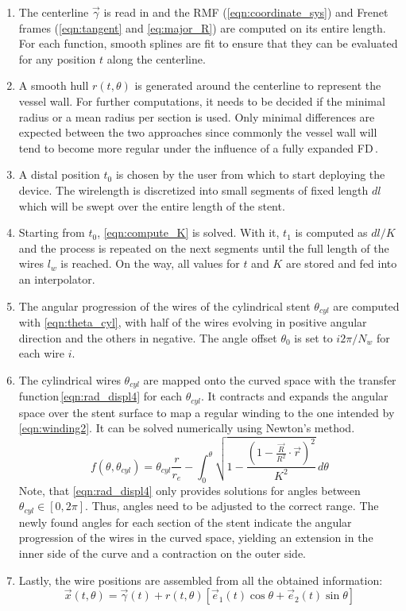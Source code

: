 \begin{enumerate}
	\item The centerline $\vec{\gamma}$ is read in and the RMF (\autoref{eqn:coordinate_sys}) and Frenet frames (\autoref{eqn:tangent} and \autoref{eq:major_R}) are computed on its entire length. For each function, smooth splines are fit to ensure that they can be evaluated for any position $t$ along the centerline.
	\item A smooth hull $r(t,\theta)$ is generated around the centerline to represent the vessel wall. For further computations, it needs to be decided if the minimal radius or a mean radius per section is used. Only minimal differences are expected between the two approaches since commonly the vessel wall will tend to become more regular under the influence of a fully expanded FD\,\cite{Bouillot2016}.
	\item A distal position $t_0$ is chosen by the user from which to start deploying the device. The wirelength is discretized into small segments of fixed length $dl$ which will be swept over the entire length of the stent.
	\item Starting from $t_0$, \autoref{eqn:compute_K} is solved. With it, $t_1$ is computed as $dl / K$ and the process is repeated on the next segments until the full length of the wires $l_w$ is reached. On the way, all values for $t$ and $K$ are stored and fed into an interpolator.
	\item The angular progression of the wires of the cylindrical stent $\theta_{cyl}$ are computed with \autoref{eqn:theta_cyl}, with half of the wires evolving in positive angular direction and the others in negative. The angle offset $\theta_0$ is set to $i2\pi/N_w$ for each wire $i$.
	\item The cylindrical wires $\theta_{cyl}$ are mapped onto the curved space with the transfer function\,\ref{eqn:rad_displ4} for each $\theta_{cyl}$. It contracts and expands the angular space over the stent surface to map a regular winding to the one intended by \autoref{eqn:winding2}. It can be solved numerically using Newton's method.
	\begin{equation}
		f(\theta, \theta_{cyl}) = \theta_{cyl}\frac{r}{r_e} -  \int_{0}^{\theta} \sqrt{1 -{\frac{ {\left(1 - \frac{\vec{R}}{R^2}\cdot \vec{r}\right)}^2}{K^2}}}\,d\theta
		\label{eqn:rad_displ4}
	\end{equation}
	Note, that \autoref{eqn:rad_displ4} only provides solutions for angles between $\theta_{cyl} \in [0, 2\pi]$. Thus, angles need to be adjusted to the correct range. The newly found angles for each section of the stent indicate the angular progression of the wires in the curved space, yielding an extension in the inner side of the curve and a contraction on the outer side.
	\item Lastly, the wire positions are assembled from all the obtained information:
	      \begin{equation*}
		      \vec{x}(t, \theta) = \vec{\gamma}(t) + r(t, \theta) \left[{\vec{e}_1(t) \cos{\theta} + \vec{e}_2(t) \sin{\theta}}\right]
	      \end{equation*}
\end{enumerate}

